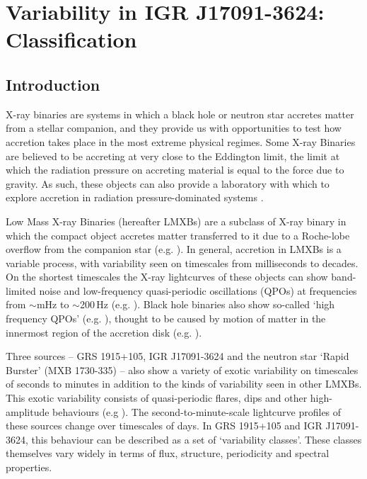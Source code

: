 \chapter{Variability in IGR J17091-3624: Classification}

\section{Introduction}

\par X-ray binaries are systems in which a black hole or neutron star accretes matter from a stellar companion, and they provide us with opportunities to test how accretion takes place in the most extreme physical regimes.  Some X-ray Binaries are believed to be accreting at very close to the Eddington limit, the limit at which the radiation pressure on accreting material is equal to the force due to gravity.  As such, these objects can also provide a laboratory with which to explore accretion in radiation pressure-dominated systems \citep{White_Radiation}.
\par Low Mass X-ray Binaries (hereafter LMXBs) are a subclass of X-ray binary in which the compact object accretes matter transferred to it due to a Roche-lobe overflow from the companion star (e.g. \citealp{Paczynski_Roche}).  In general, accretion in LMXBs is a variable process, with variability seen on timescales from milliseconds to decades.  On the shortest timescales the X-ray lightcurves of these objects can show band-limited noise and low-frequency quasi-periodic oscillations (QPOs) at frequencies from $\sim$mHz to $\sim$200\,Hz (e.g. \citealp{vanderKlis_QPOs}).  Black hole binaries also show so-called `high frequency QPOs' (e.g. \citealp{Remillard_HHz1,Remillard_HHz2,Belloni_QPOs,Belloni_Review}),  thought to be caused by motion of matter in the innermost region of the accretion disk (e.g. \citealp{Stefanov_HFQPOs}).
\par Three sources -- GRS 1915+105, IGR J17091-3624 and the neutron star `Rapid Burster' (MXB 1730-335) -- also show a variety of exotic variability on timescales of seconds to minutes in addition to the kinds of variability seen in other LMXBs.  This exotic variability consists of quasi-periodic flares, dips and other high-amplitude behaviours (e.g \citealp{Belloni_GRS_MI,Altamirano_IGR_FH,Bagnoli_RB}).  The second-to-minute-scale lightcurve profiles of these sources change over timescales of days.  In GRS 1915+105 and IGR J17091-3624, this behaviour can be described as a set of `variability classes'.  These classes themselves vary widely in terms of flux, structure, periodicity and spectral properties.
